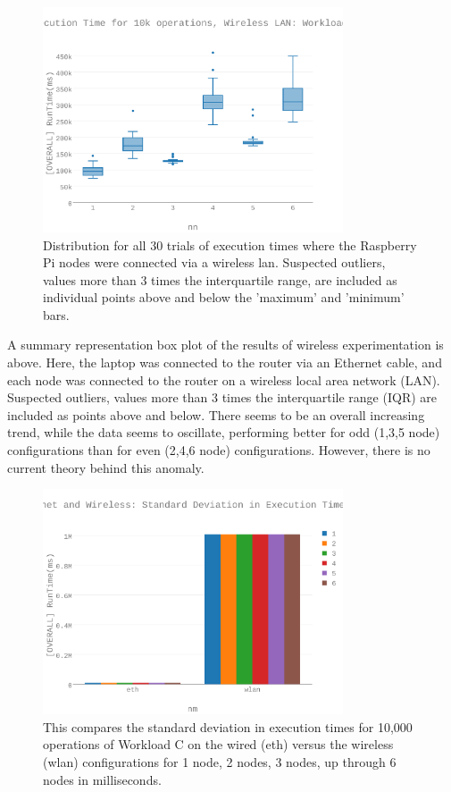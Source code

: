 \begin{figure}[h]
\includegraphics[width=3.5in]{Figures/figures-wle_fig8.pdf}

\caption{Distribution for all 30 trials of execution times where the Raspberry Pi nodes were connected via a wireless \gls{lan}.  Suspected outliers, values more than 3 times the interquartile range, are included as individual points above and below the 'maximum' and 'minimum' bars.}

\label{fig:fig08}
\end{figure}

A summary representation box plot of the results of wireless experimentation is above.  Here, the laptop was connected to the router via an Ethernet cable, and each node was connected to the router on a wireless local area network (LAN).  Suspected outliers, values more than 3 times the interquartile range (IQR) are included as points above and below.
There seems to be an overall increasing trend, while the data seems to oscillate, performing better for odd (1,3,5 node) configurations than for even (2,4,6 node) configurations.  However, there is no current theory behind this anomaly. 

\begin{figure}[h]
\includegraphics[width=3.5in]{Figures/figures-wle_fig9.pdf}

\caption{This compares the standard deviation in execution times for 10,000 operations of Workload C on the wired (eth) versus the wireless (wlan) configurations for 1 node, 2 nodes, 3 nodes, up through 6 nodes in milliseconds.}

\label{fig:fig09}
\end{figure}

